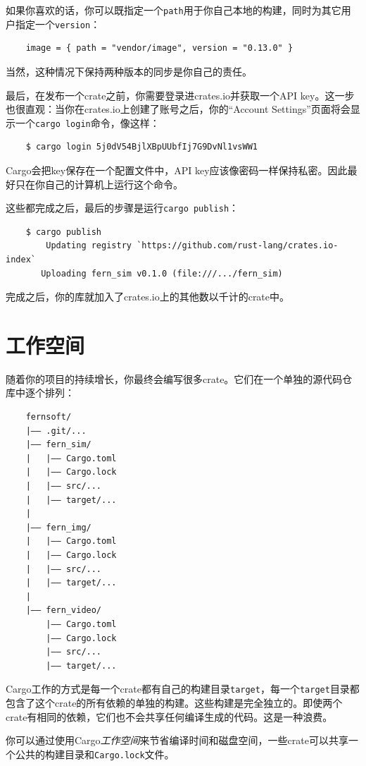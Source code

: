 如果你喜欢的话，你可以既指定一个\texttt{path}用于你自己本地的构建，同时为其它用户指定一个\texttt{version}：
\begin{verbatim}
    image = { path = "vendor/image", version = "0.13.0" }
\end{verbatim}

当然，这种情况下保持两种版本的同步是你自己的责任。

最后，在发布一个crate之前，你需要登录进crates.io并获取一个API key。这一步也很直观：当你在crates.io上创建了账号之后，你的“Account Settings”页面将会显示一个\texttt{cargo login}命令，像这样：
\begin{verbatim}
    $ cargo login 5j0dV54BjlXBpUUbfIj7G9DvNl1vsWW1
\end{verbatim}

Cargo会把key保存在一个配置文件中，API key应该像密码一样保持私密。因此最好只在你自己的计算机上运行这个命令。

这些都完成之后，最后的步骤是运行\texttt{cargo publish}：
\begin{verbatim}
    $ cargo publish
        Updating registry `https://github.com/rust-lang/crates.io-index`
       Uploading fern_sim v0.1.0 (file:///.../fern_sim)
\end{verbatim}

完成之后，你的库就加入了crates.io上的其他数以千计的crate中。

\section{工作空间}

随着你的项目的持续增长，你最终会编写很多crate。它们在一个单独的源代码仓库中逐个排列：
\begin{verbatim}
    fernsoft/
    |—— .git/...
    |—— fern_sim/
    |   |—— Cargo.toml
    |   |—— Cargo.lock
    |   |—— src/...
    |   |—— target/...
    |
    |—— fern_img/
    |   |—— Cargo.toml
    |   |—— Cargo.lock
    |   |—— src/...
    |   |—— target/...
    |
    |—— fern_video/
        |—— Cargo.toml
        |—— Cargo.lock
        |—— src/...
        |—— target/...
\end{verbatim}

Cargo工作的方式是每一个crate都有自己的构建目录\texttt{target}，每一个\texttt{target}目录都包含了这个crate的所有依赖的单独的构建。这些构建是完全独立的。即使两个crate有相同的依赖，它们也不会共享任何编译生成的代码。这是一种浪费。

你可以通过使用Cargo\emph{工作空间}来节省编译时间和磁盘空间，一些crate可以共享一个公共的构建目录和\texttt{Cargo.lock}文件。

